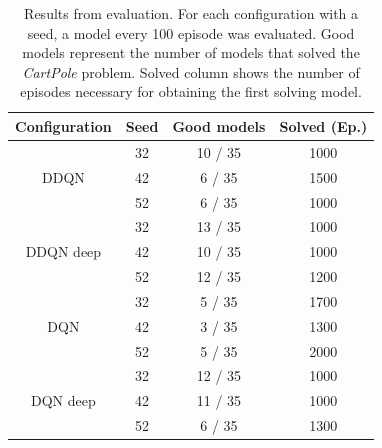 \begin{table}
	\centering
	\begin{tabular}{|c|c|c|c|}
		\hline
		\textbf{Configuration} & \textbf{Seed} & \textbf{Good models} & \textbf{Solved (Ep.)} \\
		\hline
			 & 32 & 10 / 35 & 1000 \\
		DDQN & 42 & 6 / 35 & 1500 \\
			 & 52 & 6 / 35 & 1000 \\
		\hline
		 		& 32 & 13 / 35 & 1000 \\
		DDQN deep  & 42 & 10 / 35 & 1000 \\
				  & 52 & 12 / 35 & 1200 \\
		\hline
			& 32 & 5 / 35 & 1700 \\
		DQN	& 42 & 3 / 35 & 1300 \\
			& 52 & 5 / 35 & 2000 \\
		\hline
				 & 32 & 12 / 35 & 1000 \\
		DQN deep & 42 & 11 / 35 & 1000 \\
				 & 52 & 6 / 35 & 1300 \\
		\hline
	\end{tabular}
	\caption{Results from evaluation. For each configuration with a seed, a model every 100 episode was evaluated. Good models represent the number of models that solved the \textit{CartPole} problem. Solved column shows the number of episodes necessary for obtaining the first solving model.}
	\label{tab:comparison_table}
\end{table}
